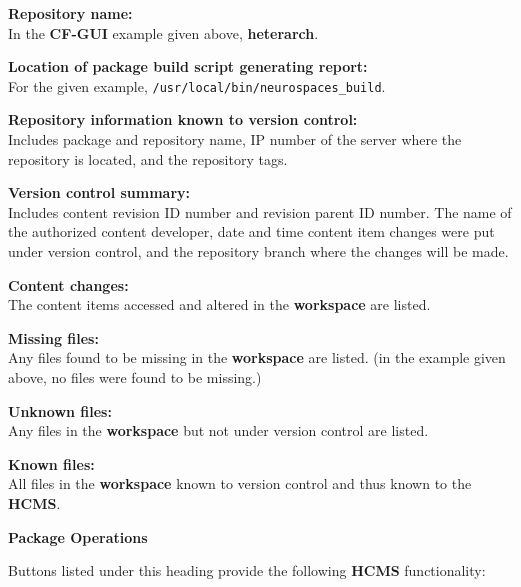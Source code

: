 \documentclass[12pt]{article}
\begin{document}
\begin{description}
\begin{description} 
\item {\bf Repository name:}\\
	In the {\small \bf CF-GUI} example given above, {\bf \small heterarch}.
\item {\bf Location of package build script generating report:}\\
	For the given example, {\tt \small /usr/local/bin/neurospaces\_build}.
\item {\bf Repository information known to version control:}\\
	Includes package and repository name, IP number of the server where the repository is located, and the repository tags.
\item {\bf Version control summary:}\\
	Includes content revision ID number and revision parent ID number. The name of the authorized content developer, date and time content item changes were put under version control, and the repository branch where the changes will be made.
\item {\bf Content changes:}\\
	The content items accessed and altered in the {\small \bf workspace} are listed.
\item {\bf Missing files:}\\
	Any files found to be missing in the {\small \bf workspace} are listed. (in the example given above, no files were found to be missing.)
\item {\bf Unknown files:}\\
	Any files in the {\small \bf workspace} but not under version control are listed.
\item {\bf Known files:}\\
	All files in the {\small \bf workspace} known to version control and thus known to the {\bf \small HCMS}.
\end{description}

\item{\bf Package Operations}

Buttons listed under this heading provide the following {\bf \small HCMS} functionality:


\end{description}
\end{document}
